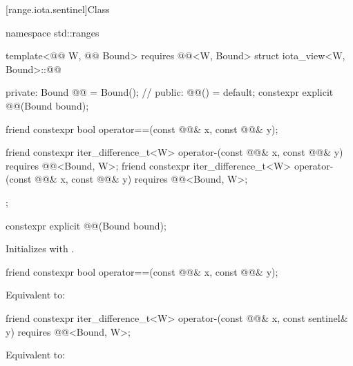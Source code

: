 [range.iota.sentinel]{Class }

%
\begin{codeblock}
namespace std::ranges {
  template<@@ W, @@ Bound>
    requires @@<W, Bound>
  struct iota_view<W, Bound>::@@ {
  private:
    Bound @@ = Bound();     // \expos
  public:
    @@() = default;
    constexpr explicit @@(Bound bound);

    friend constexpr bool operator==(const @@& x, const @@& y);

    friend constexpr iter_difference_t<W> operator-(const @@& x, const @@& y)
      requires @@<Bound, W>;
    friend constexpr iter_difference_t<W> operator-(const @@& x, const @@& y)
      requires @@<Bound, W>;
  };
}
\end{codeblock}

\begin{itemdecl}
constexpr explicit @@(Bound bound);
\end{itemdecl}

\begin{itemdescr}
\pnum
\effects
Initializes  with .
\end{itemdescr}

\begin{itemdecl}
friend constexpr bool operator==(const @@& x, const @@& y);
\end{itemdecl}

\begin{itemdescr}
\pnum
\effects
Equivalent to: 
\end{itemdescr}

\begin{itemdecl}
friend constexpr iter_difference_t<W> operator-(const @@& x, const sentinel& y)
  requires @@<Bound, W>;
\end{itemdecl}

\begin{itemdescr}
\pnum
\effects
Equivalent to: 
\end{itemdescr}


